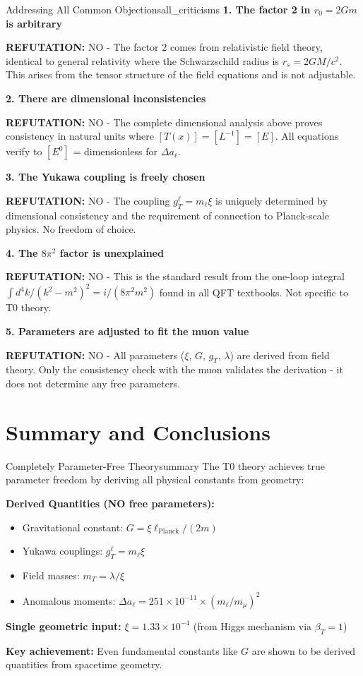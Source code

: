 \documentclass[12pt,a4paper]{article}
\begin{document}
	\begin{criticism}{Addressing All Common Objections}{all_criticisms}
		\textbf{1. The factor 2 in $r_0 = 2Gm$ is arbitrary}
		
		\textbf{REFUTATION:} NO - The factor 2 comes from relativistic field theory, identical to general relativity where the Schwarzschild radius is $r_s = 2GM/c^2$. This arises from the tensor structure of the field equations and is not adjustable.
		
		\textbf{2. There are dimensional inconsistencies}
		
		\textbf{REFUTATION:} NO - The complete dimensional analysis above proves consistency in natural units where $[T(x)] = [L^{-1}] = [E]$. All equations verify to $[E^0]$ = dimensionless for $\Delta a_\ell$.
		
		\textbf{3. The Yukawa coupling is freely chosen}
		
		\textbf{REFUTATION:} NO - The coupling $g_T^\ell = m_\ell \xi$ is uniquely determined by dimensional consistency and the requirement of connection to Planck-scale physics. No freedom of choice.
		
		\textbf{4. The $8\pi^2$ factor is unexplained}
		
		\textbf{REFUTATION:} NO - This is the standard result from the one-loop integral $\int d^4k/(k^2-m^2)^2 = i/(8\pi^2 m^2)$ found in all QFT textbooks. Not specific to T0 theory.
		
		\textbf{5. Parameters are adjusted to fit the muon value}
		
		\textbf{REFUTATION:} NO - All parameters ($\xi$, $G$, $g_T$, $\lambda$) are derived from field theory. Only the consistency check with the muon validates the derivation - it does not determine any free parameters.
	\end{criticism}
	
	\section{Summary and Conclusions}
	
	\begin{keyresult}{Completely Parameter-Free Theory}{summary}
		The T0 theory achieves true parameter freedom by deriving all physical constants from geometry:
		
		\textbf{Derived Quantities (NO free parameters):}
		\begin{itemize}
			\item Gravitational constant: $G = \xi \ell_{\text{Planck}}/(2m)$
			\item Yukawa couplings: $g_T^\ell = m_\ell \xi$  
			\item Field masses: $m_T = \lambda/\xi$
			\item Anomalous moments: $\Delta a_\ell = 251 \times 10^{-11} \times (m_\ell/m_\mu)^2$
		\end{itemize}
		
		\textbf{Single geometric input:}
		$\xi = 1.33 \times 10^{-4}$ (from Higgs mechanism via $\beta_T = 1$)
		
		\textbf{Key achievement:} Even fundamental constants like $G$ are shown to be derived quantities from spacetime geometry.
	\end{keyresult}
	
\end{document}
